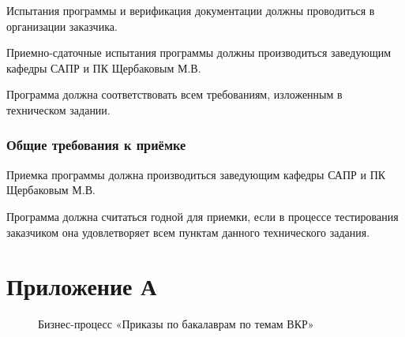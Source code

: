 \documentclass[utf8x]{article}
\begin{document}
\begin{flushleft}
Испытания программы и верификация документации должны проводиться в организации заказчика. 

Приемно-сдаточные испытания программы должны производиться заведующим кафедры САПР и ПК Щербаковым М.В. 

Программа должна соответствовать всем требованиям, изложенным в техническом задании.

\subsection{Общие требования к приёмке}

Приемка программы должна производиться заведующим кафедры САПР и ПК Щербаковым М.В.

Программа должна считаться годной для приемки, если в процессе тестирования заказчиком она удовлетворяет всем пунктам данного технического задания.

\newpage
\chapter{Приложение А}

\begin{figure}[h]
\caption{Бизнес-процесс «Приказы по бакалаврам по темам ВКР»}
\label{fig:image}
\end{figure}


\end{flushleft}
\end{document}
